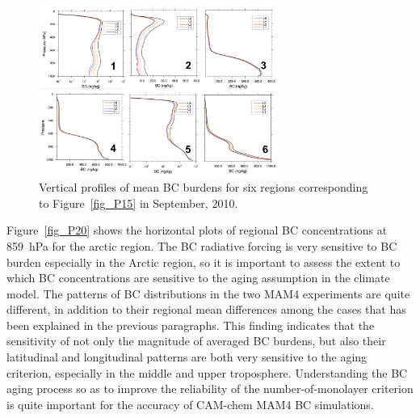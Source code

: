 \documentclass[12pt, fullpage]{uiucthesis2009_2}
\begin{document}
	
	\begin{figure}[h] 
		\begin{center}
			\includegraphics[width = 0.7\textwidth]{Figure16}
			\caption[Vertical profiles of mean BC burdens for six regions corresponding to Figure~\ref{fig_P15} in September, 2010]{\label{fig_P16} Vertical profiles of mean BC burdens for six regions corresponding to Figure~\ref{fig_P15} in September, 2010.}
		\end{center}
	\end{figure}
	
	
	Figure~\ref{fig_P20} shows the horizontal plots of regional BC concentrations at 859~hPa for the arctic region. The BC radiative forcing is very sensitive to BC burden especially in the Arctic region, so it is important to assess the extent to which BC concentrations are sensitive to the aging assumption in the climate model. The patterns of BC distributions in the two MAM4 experiments are quite different, in addition to their regional mean differences among the cases that has been explained in the previous paragraphs. This finding indicates that the sensitivity of not only the magnitude of averaged BC burdens, but also their latitudinal and longitudinal patterns are both very sensitive to the aging criterion, especially in the middle and upper troposphere. Understanding the BC aging process so as to improve the reliability of the number-of-monolayer criterion is quite important for the accuracy of CAM-chem MAM4 BC simulations.
	
\end{document}
